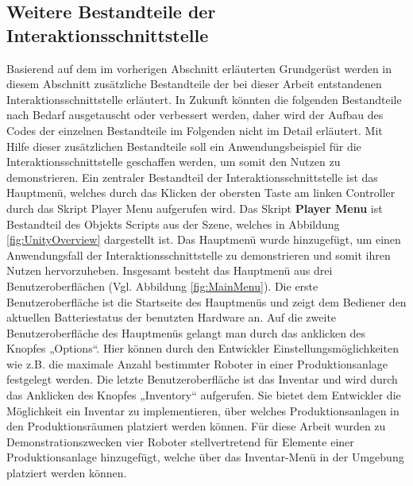 \subsection{Weitere Bestandteile der Interaktionsschnittstelle}\label{sec:WeitereTeileInteraktion}
Basierend auf dem im vorherigen Abschnitt erläuterten Grundgerüst werden in diesem Abschnitt zusätzliche Bestandteile der bei dieser Arbeit entstandenen Interaktionsschnittstelle erläutert. In Zukunft könnten die folgenden Bestandteile nach Bedarf ausgetauscht oder verbessert werden, daher wird der Aufbau des Codes der einzelnen Bestandteile im Folgenden nicht im Detail erläutert. Mit Hilfe dieser zusätzlichen Bestandteile soll ein Anwendungsbeispiel für die Interaktionsschnittstelle geschaffen werden, um somit den Nutzen zu demonstrieren.
\newline\newline
Ein zentraler Bestandteil der Interaktionsschnittstelle ist das Hauptmenü, welches durch das Klicken der obersten Taste am linken Controller durch das Skript Player Menu aufgerufen wird. Das Skript \textbf{Player Menu} ist Bestandteil des Objekts Scripts aus der Szene, welches in Abbildung \ref{fig:UnityOverview} dargestellt ist. Das Hauptmenü wurde hinzugefügt, um einen Anwendungsfall der Interaktionsschnittstelle zu demonstrieren und somit ihren Nutzen hervorzuheben. Insgesamt besteht das Hauptmenü aus drei Benutzeroberflächen (Vgl. Abbildung \ref{fig:MainMenu}). Die erste Benutzeroberfläche ist die Startseite des Hauptmenüs und zeigt dem Bediener den aktuellen Batteriestatus der benutzten Hardware an. Auf die zweite Benutzeroberfläche des Hauptmenüs gelangt man durch das anklicken des Knopfes „Options“. Hier können durch den Entwickler Einstellungsmöglichkeiten wie z.B. die maximale Anzahl bestimmter Roboter in einer Produktionsanlage festgelegt werden. Die letzte Benutzeroberfläche ist das Inventar und wird durch das Anklicken des Knopfes „Inventory“ aufgerufen. Sie bietet dem Entwickler die Möglichkeit ein Inventar zu implementieren, über welches Produktionsanlagen in den Produktionsräumen platziert werden können. Für diese Arbeit wurden zu Demonstrationszwecken vier Roboter stellvertretend für Elemente einer Produktionsanlage hinzugefügt, welche über das Inventar-Menü in der Umgebung platziert werden können.
